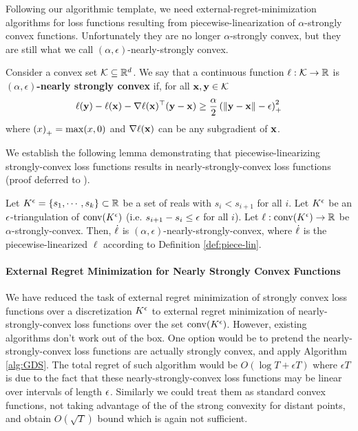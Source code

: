 \documentclass[final,12pt]{alt2025}
\begin{document}
Following our algorithmic template, we need external-regret-minimization algorithms for loss functions resulting from piecewise-linearization of $\alpha$-strongly convex functions. Unfortunately they are no longer $\alpha$-strongly convex, but they are still what we call $(\alpha,\epsilon)$-nearly-strongly convex.

\begin{definition}\label{def:NSC}
    Consider a convex set $\mathcal{K} \subseteq \mathbb{R}^d$.  We say that a continuous function $\ell: \mathcal{K} \to \mathbb{R}$ is \textbf{$(\alpha,\epsilon)$-nearly strongly convex} if, for all $\mathbf{x},\mathbf{y} \in \mathcal{K}$
    \begin{equation}
        \ell(\mathbf{y})-\ell(\mathbf{x})-\nabla \ell(\mathbf{x})^\top(\mathbf{y}-\mathbf{x}) \geq \frac{\alpha}{2}\left(\left\|\mathbf{y}-\mathbf{x}\right\|-\epsilon\right)_+^2
    \end{equation}
    where $\left(x\right)_+ = \max(x,0)$ and $\nabla \ell(\mathbf{x})$ can be any subgradient of $\mathbf{x}$.
\end{definition}

We establish the following lemma demonstrating that piecewise-linearizing strongly-convex loss functions results in nearly-strongly-convex loss functions (proof deferred to ).

\begin{lemma}\label{lemma:linearized_is_nearly_strongly_convex}
    Let $K^{\epsilon} = \left\{s_1,\cdots,s_k\right\} \subset \mathbb{R}$ be a set of reals with $s_i<s_{i+1}$ for all $i$.  Let $K^{\epsilon}$ be an $\epsilon$-triangulation of $\mathrm{conv}(K^{\epsilon})$ (i.e. $s_{i+1}-s_i \leq \epsilon$ for all $i$). Let $\ell: \mathrm{conv}(K^{\epsilon}) \to \mathbb{R}$ be $\alpha$-strongly-convex.  Then, $\dot{\ell}$ is $(\alpha,\epsilon)$-nearly-strongly-convex, where $\dot{\ell}$ is the piecewise-linearized $\ell$ according to Definition \ref{def:piece-lin}.
\end{lemma}

\paragraph{External Regret Minimization for Nearly Strongly Convex Functions}
We have reduced the task of external regret minimization of strongly convex loss functions over a discretization $K^{\epsilon}$ to external regret minimization of nearly-strongly-convex loss functions over the set $\mathrm{conv}(K^{\epsilon})$. However, existing algorithms don't work out of the box. One option would be to pretend the nearly-strongly-convex loss functions are actually strongly convex, and apply Algorithm \ref{alg:GDS}. The total regret of such algorithm would be $O(\log T + \epsilon T)$ where $\epsilon T$ is due to the fact that these nearly-strongly-convex loss functions may be linear over intervals of length $\epsilon$. Similarly we could treat them as standard convex functions, not taking advantage of the of the strong convexity for distant points, and obtain $O(\sqrt{T})$ bound which is again not sufficient.
\end{document}
